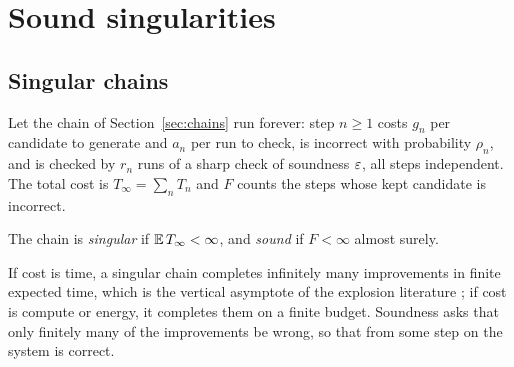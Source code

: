 \section{Sound singularities}\label{sec:singularity}

\subsection{Singular chains}

Let the chain of Section~\ref{sec:chains} run forever: step $n\ge1$ costs $g_{n}$ per candidate to generate and $a_{n}$ per run to check, is incorrect with probability $\rho_{n}$, and is checked by $r_{n}$ runs of a sharp check of soundness $\varepsilon$, all steps independent. The total cost is $T_{\infty}=\sum_{n}T_{n}$ and $F$ counts the steps whose kept candidate is incorrect.

\begin{definition}\label{def:singular}
The chain is \emph{singular} if $\mathbb{E}\,T_{\infty}<\infty$, and \emph{sound} if $F<\infty$ almost surely.
\end{definition}

If cost is time, a singular chain completes infinitely many improvements in finite expected time, which is the vertical asymptote of the explosion literature \cite{Goo66,Ord26}; if cost is compute or energy, it completes them on a finite budget. Soundness asks that only finitely many of the improvements be wrong, so that from some step on the system is correct.

